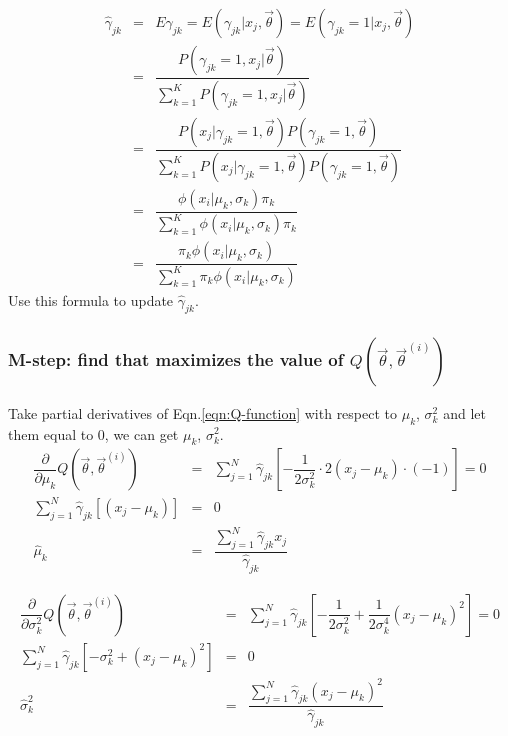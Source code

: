 \begin{eqnarray}
\hat{\gamma}_{jk} &=& E\gamma_{jk} = E(\gamma_{jk}|x_j,\vec{\theta})=E(\gamma_{jk}=1|x_j,\vec{\theta}) \nonumber \\
	&=& \dfrac{P(\gamma_{jk}=1, x_j|\vec{\theta})}{\sum\limits_{k=1}^K{P(\gamma_{jk}=1, x_j|\vec{\theta})}} \nonumber \\
	&=& \dfrac{P(x_j|\gamma_{jk}=1, \vec{\theta})P(\gamma_{jk}=1, \vec{\theta})}{\sum\limits_{k=1}^K{P(x_j|\gamma_{jk}=1, \vec{\theta})P(\gamma_{jk}=1, \vec{\theta})}} \nonumber \\
	&=& \dfrac{\phi(x_i|\mu_k,\sigma_k)\pi_k}{\sum\limits_{k=1}^K{\phi(x_i|\mu_k,\sigma_k)\pi_k}} \nonumber \\
	&=& \dfrac{\pi_k\phi(x_i|\mu_k,\sigma_k)}{\sum\limits_{k=1}^K{\pi_k\phi(x_i|\mu_k,\sigma_k)}} \nonumber
\end{eqnarray}
Use this formula to update $\hat{\gamma}_{jk}$.

\subsubsection{M-step: find \vec{\theta} that maximizes the value of $Q(\vec{\theta}, \vec{\theta}^{(i)})$}
Take partial derivatives of Eqn.\eqref{eqn:Q-function} with respect to $\mu_k$, $\sigma_k^2$ and let them equal to 0, we can get $\mu_k$, $\sigma_k^2$.
\begin{eqnarray}
\dfrac{\partial}{\partial \mu_k}Q(\vec{\theta}, \vec{\theta}^{(i)}) &=& \sum\limits_{j=1}^N{\hat{\gamma}_{jk}\left[-\dfrac{1}{2\sigma_k^2} \cdot 2\left(x_j-\mu_k\right) \cdot (-1)\right]} = 0 \nonumber \\
\sum\limits_{j=1}^N{\hat{\gamma}_{jk}\left[\left(x_j-\mu_k\right)\right]} &=& 0 \nonumber \\
\hat{\mu}_k &=& \dfrac{\sum\limits_{j=1}^N{\hat{\gamma}_{jk}x_j}}{\hat{\gamma}_{jk}}
\end{eqnarray}

\begin{eqnarray}
\dfrac{\partial}{\partial \sigma_k^2}Q(\vec{\theta}, \vec{\theta}^{(i)}) &=& \sum\limits_{j=1}^N{\hat{\gamma}_{jk}\left[-\dfrac{1}{2\sigma_k^2}+\dfrac{1}{2\sigma_k^4}\left(x_j-\mu_k\right)^2\right]} = 0 \nonumber \\
\sum\limits_{j=1}^N{\hat{\gamma}_{jk}\left[-\sigma_k^2+\left(x_j-\mu_k\right)^2\right]} &=& 0 \nonumber \\
\hat{\sigma}_k^2 &=& \dfrac{\sum\limits_{j=1}^N{\hat{\gamma}_{jk}\left(x_j-\mu_k\right)^2}}{\hat{\gamma}_{jk}}
\end{eqnarray}

